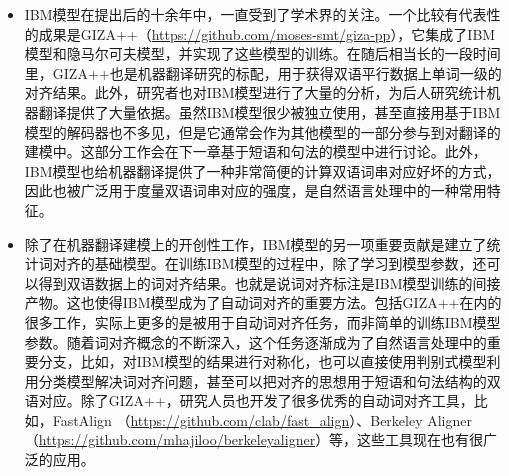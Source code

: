 \begin{itemize}
\vspace{0.5em}
\item IBM模型在提出后的十余年中，一直受到了学术界的关注。一个比较有代表性的成果是GIZA++（\url{https://github.com/moses-smt/giza-pp}），它集成了IBM模型和隐马尔可夫模型，并实现了这些模型的训练。在随后相当长的一段时间里，GIZA++也是机器翻译研究的标配，用于获得双语平行数据上单词一级的对齐结果。此外，研究者也对IBM模型进行了大量的分析，为后人研究统计机器翻译提供了大量依据\cite{och2004alignment}。虽然IBM模型很少被独立使用，甚至直接用基于IBM模型的解码器也不多见，但是它通常会作为其他模型的一部分参与到对翻译的建模中。这部分工作会在下一章基于短语和句法的模型中进行讨论\cite{koehn2003statistical}。此外，IBM模型也给机器翻译提供了一种非常简便的计算双语词串对应好坏的方式，因此也被广泛用于度量双语词串对应的强度，是自然语言处理中的一种常用特征。
\vspace{0.5em}
\item 除了在机器翻译建模上的开创性工作，IBM模型的另一项重要贡献是建立了统计词对齐的基础模型。在训练IBM模型的过程中，除了学习到模型参数，还可以得到双语数据上的词对齐结果。也就是说词对齐标注是IBM模型训练的间接产物。这也使得IBM模型成为了自动词对齐的重要方法。包括GIZA++在内的很多工作，实际上更多的是被用于自动词对齐任务，而非简单的训练IBM模型参数。随着词对齐概念的不断深入，这个任务逐渐成为了自然语言处理中的重要分支，比如，对IBM模型的结果进行对称化\cite{och2003systematic}，也可以直接使用判别式模型利用分类模型解决词对齐问题\cite{ittycheriah2005maximum}，甚至可以把对齐的思想用于短语和句法结构的双语对应\cite{xiao2013unsupervised}。除了GIZA++，研究人员也开发了很多优秀的自动词对齐工具，比如，FastAlign （\url{https://github.com/clab/fast_align}）、Berkeley Aligner（\url{https://github.com/mhajiloo/berkeleyaligner}）等，这些工具现在也有很广泛的应用。
\vspace{0.5em}
\end{itemize}









